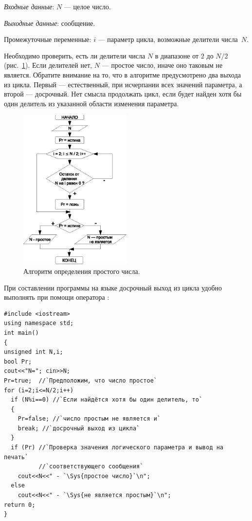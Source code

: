 
\emph{Входные данные}: $N$ --- целое число.

\emph{Выходные данные}: сообщение.

Промежуточные переменные: $i$ --- параметр цикла, возможные делители числа~$N$.

Необходимо проверить, есть ли делители числа $N$ в диапазоне от $2$ до $N/2$ (рис.~\ref{ch03:refDrawing31}). Если
делителей нет, $N$ --- простое число, иначе оно таковым не является. Обратите внимание на то, что в
алгоритме предусмотрено два выхода из цикла. Первый --- естественный, при исчерпании всех значений параметра, 
а второй --- досрочный. Нет смысла продолжать цикл, если будет найден хотя бы один  делитель из указанной области изменения
параметра.

\begin{figure}[htb]
\begin{center}
\includegraphics[width=0.5\textwidth]{img/ris_3_32}
\caption{Алгоритм определения простого числа.}
\label{ch03:refDrawing31}
\end{center}
\end{figure}

При составлении программы на языке  досрочный выход из цикла удобно выполнять при помощи оператора
:
\begin{lstlisting}
#include <iostream>
using namespace std;
int main()
{
unsigned int N,i;
bool Pr;
cout<<"N="; cin>>N;
Pr=true;  //`Предположим, что число простое`
for (i=2;i<=N/2;i++)
  if (N%i==0) //`Если найдётся хотя бы один делитель, то`
  {
    Pr=false; //`число простым не является и`
    break; //`досрочный выход из цикла`
  }
  if (Pr) //`Проверка значения логического параметра и вывод на печать`
          //`соответствующего сообщения`
    cout<<N<<" - `\Sys{простое число}`\n";
  else
    cout<<N<<" - `\Sys{не является простым}`\n";
return 0;
}
\end{lstlisting}

